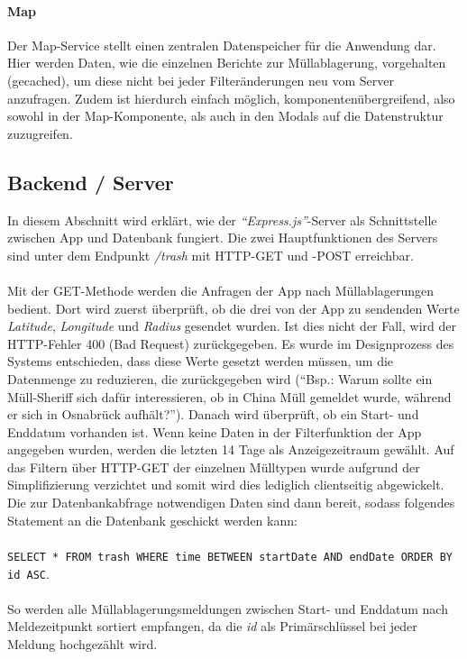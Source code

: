 \documentclass[a4paper, 11pt, DIV=11, listof=numbered, numbers=noenddot]{scrartcl}
\begin{document}
	\paragraph{Map}
	Der Map-Service stellt einen zentralen Datenspeicher für die Anwendung dar. Hier werden Daten, wie die einzelnen Berichte zur Müllablagerung, vorgehalten (gecached), um diese nicht bei jeder Filteränderungen neu vom Server anzufragen.
	Zudem ist hierdurch einfach möglich, komponentenübergreifend, also sowohl in der Map-Komponente, als auch in den Modals auf die Datenstruktur zuzugreifen.
	
	\subsection{Backend / Server}
	In diesem Abschnitt wird erklärt, wie der \textit{\enquote{Express.js}}-Server als Schnittstelle zwischen App und Datenbank fungiert. Die zwei Hauptfunktionen des Servers sind unter dem Endpunkt \textit{/trash} mit HTTP-GET und -POST erreichbar.\\
	\textbf{}\\
	Mit der GET-Methode werden die Anfragen der App nach Müllablagerungen bedient. Dort wird zuerst überprüft, ob die drei von der App zu sendenden Werte \textit{Latitude}, \textit{Longitude} und \textit{Radius} gesendet wurden. Ist dies nicht der Fall, wird der HTTP-Fehler 400 (Bad Request) zurückgegeben.
	Es wurde im Designprozess des Systems entschieden, dass diese Werte gesetzt werden müssen, um die Datenmenge zu reduzieren, die zurückgegeben wird (\enquote{Bsp.: Warum sollte ein Müll-Sheriff sich dafür interessieren, ob in China Müll gemeldet wurde, während er sich in Osnabrück aufhält?}).
	Danach wird überprüft, ob ein Start- und Enddatum vorhanden ist. Wenn keine Daten in der Filterfunktion der App angegeben wurden, werden die letzten 14 Tage als Anzeigezeitraum gewählt. Auf das Filtern über HTTP-GET der einzelnen Mülltypen wurde aufgrund der Simplifizierung verzichtet und somit wird dies lediglich clientseitig abgewickelt.\\
	Die zur Datenbankabfrage notwendigen Daten sind dann bereit, sodass folgendes Statement an die Datenbank geschickt werden kann:\\
	\textbf{}\\
	\texttt{SELECT * FROM trash WHERE time BETWEEN startDate AND endDate ORDER BY id ASC}.\\
	\textbf{}\\
	So werden alle Müllablagerungsmeldungen zwischen Start- und Enddatum nach Meldezeitpunkt sortiert empfangen, da die \textit{id} als Primärschlüssel bei jeder Meldung hochgezählt wird.
\end{document}
